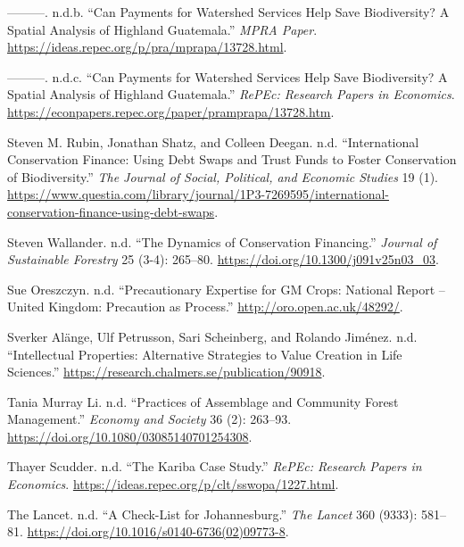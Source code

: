 \begin{CSLReferences}{1}{0}
---------. n.d.b. {``Can Payments for Watershed Services Help Save
Biodiversity? A Spatial Analysis of Highland Guatemala.''} \emph{MPRA
Paper}. \url{https://ideas.repec.org/p/pra/mprapa/13728.html}.

---------. n.d.c. {``Can Payments for Watershed Services Help Save
Biodiversity? A Spatial Analysis of Highland Guatemala.''} \emph{RePEc:
Research Papers in Economics}.
\url{https://econpapers.repec.org/paper/pramprapa/13728.htm}.

Steven M. Rubin, Jonathan Shatz, and Colleen Deegan. n.d.
{``International Conservation Finance: Using Debt Swaps and Trust Funds
to Foster Conservation of Biodiversity.''} \emph{The Journal of Social,
Political, and Economic Studies} 19 (1).
\url{https://www.questia.com/library/journal/1P3-7269595/international-conservation-finance-using-debt-swaps}.

Steven Wallander. n.d. {``The Dynamics of Conservation Financing.''}
\emph{Journal of Sustainable Forestry} 25 (3-4): 265--80.
\url{https://doi.org/10.1300/j091v25n03_03}.

Sue Oreszczyn. n.d. {``Precautionary Expertise for GM Crops: National
Report -- United Kingdom: Precaution as Process.''}
\url{http://oro.open.ac.uk/48292/}.

Sverker Alänge, Ulf Petrusson, Sari Scheinberg, and Rolando Jiménez.
n.d. {``Intellectual Properties: Alternative Strategies to Value
Creation in Life Sciences.''}
\url{https://research.chalmers.se/publication/90918}.

Tania Murray Li. n.d. {``Practices of Assemblage and Community Forest
Management.''} \emph{Economy and Society} 36 (2): 263--93.
\url{https://doi.org/10.1080/03085140701254308}.

Thayer Scudder. n.d. {``The Kariba Case Study.''} \emph{RePEc: Research
Papers in Economics}.
\url{https://ideas.repec.org/p/clt/sswopa/1227.html}.

The Lancet. n.d. {``A Check-List for Johannesburg.''} \emph{The Lancet}
360 (9333): 581--81.
\url{https://doi.org/10.1016/s0140-6736(02)09773-8}.


\end{CSLReferences}
